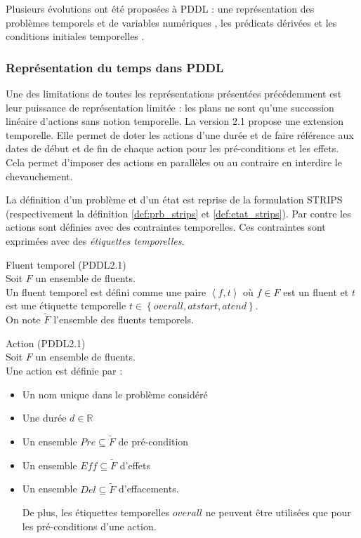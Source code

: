 Plusieurs évolutions ont été proposées à PDDL : une représentation des problèmes temporels et de variables numériques \cite{Fox2003}, les prédicats dérivées et les conditions initiales temporelles \cite{Edelkamp2004}.%

\subsubsection{Représentation du temps dans PDDL}
\label{sec:pddl_time}

Une des limitations de toutes les représentations présentées précédemment est leur puissance de représentation limitée : les plans ne sont qu'une succession linéaire d'actions sans notion temporelle. 
La version 2.1 \cite{Fox2003} propose une extension temporelle. 
Elle permet de doter les actions d'une durée et de faire référence aux dates de début et de fin de chaque action pour les pré-conditions et les effets.
Cela permet d'imposer des actions en parallèles ou au contraire en interdire le chevauchement.

La définition d'un problème et d'un état est reprise de la formulation STRIPS (respectivement la définition \ref{def:prb_strips} et \ref{def:etat_strips}).
Par contre les actions sont définies avec des contraintes temporelles.
Ces contraintes sont exprimées avec des \emph{étiquettes temporelles}.

\begin{definition}Fluent temporel (PDDL2.1)\\
	\label{def:fluent_temp_pddl21}
	Soit $F$ un ensemble de fluents.\\
	Un fluent temporel est défini comme une paire $\left< f, t \right>$ où $f \in F$ est un fluent et $t$ est une étiquette temporelle $t \in \left\lbrace overall, atstart, atend \right\rbrace $.\\
	On note $\tilde{F}$ l'ensemble des fluents temporels.
\end{definition}

\begin{definition}Action (PDDL2.1)\\
	\label{def:action_pddl21}
	Soit $F$ un ensemble de fluents.\\ Une action est définie par :
	\begin{itemize}
		\item Un nom unique dans le problème considéré
		\item Une durée $d \in \mathbb{R}$
		\item Un ensemble $Pre \subseteq \tilde{F}$ de pré-condition
		\item Un ensemble $Eff \subseteq \tilde{F}$ d'effets
		\item Un ensemble $Del \subseteq \tilde{F}$ d'effacements.
		
		De plus, les étiquettes temporelles $overall$ ne peuvent être utilisées que pour les pré-conditions d'une action.
	\end{itemize}
\end{definition}

